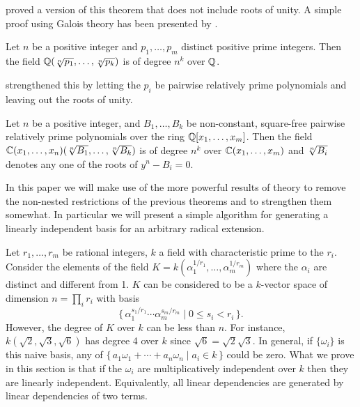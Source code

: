 {\Besicovitch} \cite{Besicovitch:Radicals} proved a version of this
theorem that does not include roots of unity.  A simple proof using
Galois theory has been presented by {\Richards} \cite{Richards:Radicals}.

\begin{proposition}
Let $n$ be a positive integer and $p_1, \ldots, p_m$ distinct positive
prime integers.  Then the field $\Q(\root n\of{p_1}, \ldots, \root
n\of{p_k})$ is of degree $n^k$ over $\mathbb{Q}$.
\end{proposition}

\noindent
{\Fateman} strengthened this by letting the $p_i$ be pairwise
relatively prime polynomials and leaving out the roots of unity.

\begin{proposition}
Let $n$ be a positive integer, and $B_1,\ldots, B_k$ be non-constant,
square-free pairwise relatively prime polynomials over the ring
$\mathbb{Q}[x_1, \ldots, x_m]$.  Then the field $\C(x_1, \ldots, x_n)(\root n
\of {B_1}, \ldots, \root n \of {B_k})$ is of degree $n^k$ over
$\mathbb{C}(x_1, \ldots, x_m)$ and $\root n \of {B_i}$ denotes any one of the
roots of $y^n - B_i = 0$.
\end{proposition}

In this paper we will make use of the more powerful results of
{\Kummer} theory to remove the non-nested restrictions of the previous
theorems and to strengthen them somewhat.  In particular we will
present a simple algorithm for generating a linearly independent basis
for an arbitrary radical extension.

\medskip
Let $r_1, \ldots, r_m$ be rational
integers, $k$ a field with characteristic prime to the $r_i$. Consider
the elements of the field $K = k(\alpha_1^{1/r_1}, \ldots,
\alpha_m^{1/r_m})$ where the $\alpha_i$ are distinct and different
from 1.  $K$ can be considered to be a $k$-vector space of dimension
$n = \prod_i r_i$ with basis
\[
\{\,\alpha_1^{s_1/r_1} \cdots \alpha_m^{s_m/r_m} \mid 0 \le s_i < r_i\,\}.
\]
However, the degree of $K$ over $k$ can be less than $n$.  For
instance, $k(\sqrt{2}, \sqrt{3}, \sqrt{6})$ has degree 4 over $k$
since $\sqrt{6} = \sqrt{2} \sqrt{3}$.  In general, if $\{\omega_i\}$
is this naive basis, any of $\{\,a_1 \omega_1 + \cdots + a_n \omega_n
\mid a_i \in k\,\}$ could be zero.  What we prove in this section is that
if the $\omega_i$ are multiplicatively independent over $k$ then they
are linearly independent.  Equivalently, all linear dependencies are
generated by linear dependencies of two terms.

